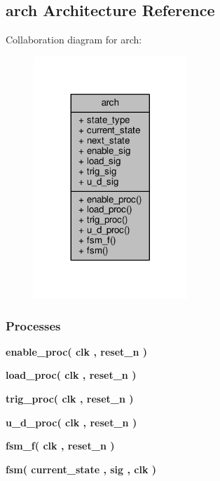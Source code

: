 \subsection{arch Architecture Reference}
\label{classgpio__chirp__sync__FSM_1_1arch}


Collaboration diagram for arch\+:\nopagebreak
\begin{figure}[H]
\begin{center}
\leavevmode
\includegraphics[width=164pt]{da/d43/classgpio__chirp__sync__FSM_1_1arch__coll__graph}
\end{center}
\end{figure}
\subsubsection*{Processes}
 \begin{DoxyCompactItemize}
\item 
{\bf enable\+\_\+proc}{\bfseries  ( {\bfseries {\bfseries {\bf clk}} \textcolor{vhdlchar}{ }} , {\bfseries {\bfseries {\bf reset\+\_\+n}} \textcolor{vhdlchar}{ }} )}
\item 
{\bf load\+\_\+proc}{\bfseries  ( {\bfseries {\bfseries {\bf clk}} \textcolor{vhdlchar}{ }} , {\bfseries {\bfseries {\bf reset\+\_\+n}} \textcolor{vhdlchar}{ }} )}
\item 
{\bf trig\+\_\+proc}{\bfseries  ( {\bfseries {\bfseries {\bf clk}} \textcolor{vhdlchar}{ }} , {\bfseries {\bfseries {\bf reset\+\_\+n}} \textcolor{vhdlchar}{ }} )}
\item 
{\bf u\+\_\+d\+\_\+proc}{\bfseries  ( {\bfseries {\bfseries {\bf clk}} \textcolor{vhdlchar}{ }} , {\bfseries {\bfseries {\bf reset\+\_\+n}} \textcolor{vhdlchar}{ }} )}
\item 
{\bf fsm\+\_\+f}{\bfseries  ( {\bfseries {\bfseries {\bf clk}} \textcolor{vhdlchar}{ }} , {\bfseries {\bfseries {\bf reset\+\_\+n}} \textcolor{vhdlchar}{ }} )}
\item 
{\bf fsm}{\bfseries  ( {\bfseries {\bfseries {\bf current\+\_\+state}} \textcolor{vhdlchar}{ }} , {\bfseries {\bfseries {\bf sig}} \textcolor{vhdlchar}{ }} , {\bfseries {\bfseries {\bf clk}} \textcolor{vhdlchar}{ }} )}
\end{DoxyCompactItemize}
